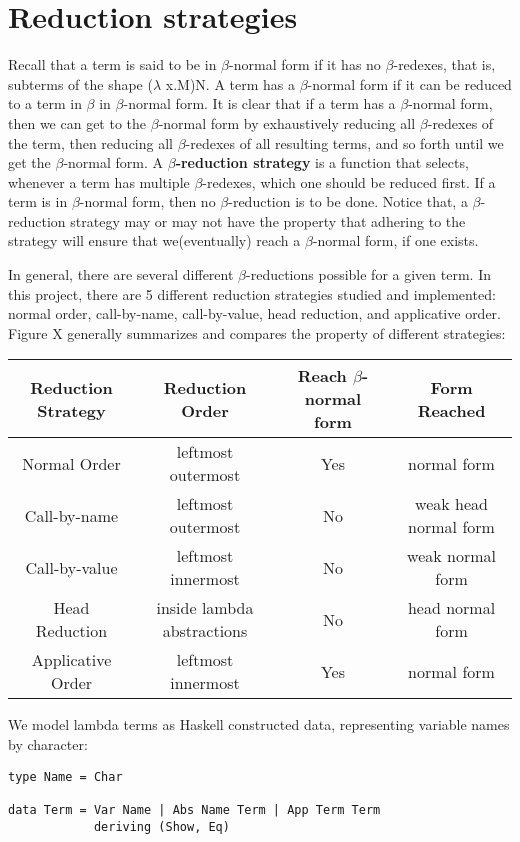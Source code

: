 \documentclass[a4paper,11pt,twoside]{report}
\begin{document}
\section{Reduction strategies}
\noindent Recall that a term is said to be in $\beta$-normal form if it has no $\beta$-redexes, that is, subterms of the shape ($\lambda$ x.M)N. A term has a $\beta$-normal form if it can be reduced to a term in $\beta$ in $\beta$-normal form. It is clear that if a term has a $\beta$-normal form, then we can get to the $\beta$-normal form by exhaustively reducing all $\beta$-redexes of the term, then reducing all $\beta$-redexes of all resulting terms, and so forth until we get the $\beta$-normal form. A \textbf{$\beta$-reduction strategy} is a function that selects, whenever a term has multiple $\beta$-redexes, which one should be reduced first. If a term is in $\beta$-normal form, then no $\beta$-reduction is to be done. Notice that, a $\beta$-reduction strategy may or may not have the property that adhering to the strategy will ensure that we(eventually) reach a $\beta$-normal form, if one exists. 

In general, there are several different $\beta$-reductions possible for a given term. In this project, there are 5 different reduction strategies studied and implemented: normal order, call-by-name, call-by-value, head reduction, and applicative order. Figure X generally summarizes and compares the property of different strategies: 
\begin{center}
\begin{tabular}{|c|c|c|c|}\hline
Reduction Strategy & Reduction Order & Reach $\beta$-normal form & Form Reached\\ \hline
Normal Order & leftmost outermost & Yes & normal form\\ \hline
Call-by-name & leftmost outermost & No  & weak head normal form\\ \hline
Call-by-value & leftmost innermost & No & weak normal form\\ \hline
Head Reduction & inside lambda abstractions & No & head normal form\\ \hline
Applicative Order & leftmost innermost & Yes & normal form\\ \hline
\end{tabular}
\end{center}

We model lambda terms as Haskell constructed data, representing variable names by character:

\begin{verbatim}
type Name = Char  

data Term = Var Name | Abs Name Term | App Term Term
            deriving (Show, Eq)
\end{verbatim}
\end{document}
